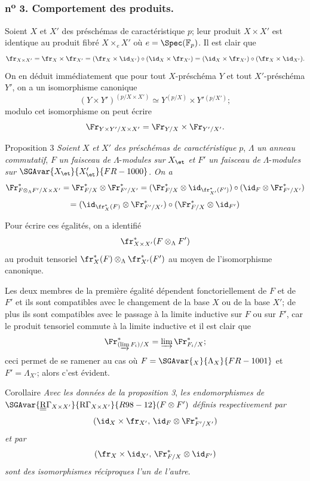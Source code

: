 \subsubsection*{n\textsuperscript{o} 3. Comportement des produits.}

Soient $X$ et $X'$ des préschémas de caractéristique $p$; leur produit $X\times X'$ est identique au produit fibré $X\times_eX'$ où $e=\Spec(\mathbb{F}_p)$. Il est clair que
\[
\fr_{X\times X'}=\fr_X\times\fr_{X'}=(\fr_X\times\id_{X'})\circ(\id_X\times\fr_{X'})
=(\id_X\times\fr_{X'})\circ(\fr_X\times\id_{X'}).
\]
On en déduit immédiatement que pour tout $X$-préschéma $Y$ et tout $X'$-préschéma $Y'$, on a un isomorphisme canonique
\[
(Y\times Y')^{(p/X\times X')}\simeq Y^{(p/X)}\times Y'{}^{(p/X')};
\]
modulo cet isomorphisme on
peut écrire
\[
\Fr_{Y\times Y'/X\times X'}=\Fr_{Y/X}\times\Fr_{Y'/X'}.
\]

\begin{statement}{Proposition 3}
\emph{Soient} $X$ \emph{et} $X'$ \emph{des préschémas de caractéristique} $p$, $\Lambda$ \emph{un anneau commutatif}, $F$ \emph{un faisceau de} $\Lambda$-\emph{modules sur} $X_{\et}$ \emph{et} $F'$ \emph{un faisceau de} $\Lambda$-\emph{modules sur} $\SGAvar{X_{\et}}{X'_{\et}}{FR-1000}$. \emph{On a}
\[
\Fr^*_{F\otimes_\Lambda F'/X\times X'}
=\Fr^*_{F/X}\otimes\Fr^*_{F'/X'}
=(\Fr^*_{F/X}\otimes\id_{\fr_{X'}^*(F')})\circ
(\id_F\otimes\Fr^*_{F'/X'})
\]
\[
=(\id_{\fr_X^*(F)}\otimes\Fr^*_{F'/X'})\circ
(\Fr^*_{F/X}\otimes\id_{F'})
\]
\end{statement}

Pour écrire ces égalités, on a identifié
\[
\fr_{X\times X'}^*(F\otimes_\Lambda F')
\]
au produit tensoriel $\fr_X^*(F)\otimes_\Lambda\fr_{X'}^*(F')$ au moyen de l'isomorphisme canonique.

Les deux membres de la première égalité dépendent fonctoriellement de $F$ et de $F'$ et ils sont compatibles avec le changement de la base $X$ ou de la base $X'$; de plus ils sont compatibles avec le passage à la limite inductive sur $F$ ou sur $F'$, car le produit tensoriel commute à la limite inductive et il est clair que
\[
\Fr^*_{(\varinjlim F_i)/X}=\varinjlim\Fr^*_{F_i/X};
\]
ceci permet de se ramener au cas où $F=\SGAvar{{}_X}{\Lambda_X}{FR-1001}$ et $F'=\Lambda_{X'}$; alors c'est évident.

\begin{statement}{Corollaire}
\emph{Avec les données de la proposition 3}, \emph{les endomorphismes de} $\SGAvar{\underline{\underline{\mathrm{R}}}\Gamma_{X\times X'}}{\mathrm{R}\Gamma_{X\times X'}}{R98-12}(F\otimes F')$ \emph{définis respectivement par}
\[
(\id_X\times\fr_{X'},\,\id_F\otimes\Fr^*_{F'/X'})
\]
\emph{et par}
\[
(\fr_X\times\id_{X'},\,\Fr^*_{F/X}\otimes\id_{F'})
\]
\emph{sont des isomorphismes réciproques l'un de l'autre}.
\end{statement}

